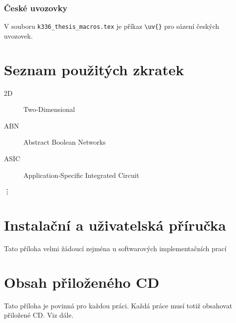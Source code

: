 \documentclass[11pt,twoside,a4paper]{book}
\begin{document}
\subsection{České uvozovky}
V souboru \verb|k336_thesis_macros.tex| je příkaz \verb|\uv{}| pro sázení českých uvozovek. 


\chapter{Seznam použitých zkratek}

\begin{description}
\item[2D] Two-Dimensional
\item[ABN] Abstract Boolean Networks
\item[ASIC] Application-Specific Integrated Circuit
\end{description}
\vdots


\chapter{Instalační a uživatelská příručka}
Tato příloha velmi žádoucí zejména u softwarových implementačních prací


\chapter{Obsah přiloženého CD}
\label{chap:CD}
Tato příloha je povinná pro každou práci. Každá práce musí totiž obsahovat přiložené CD. Viz dále.
\end{document}
